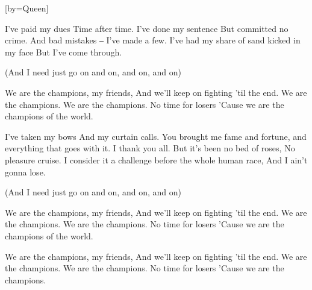  

[by=Queen]



\chordsoff
\beginverse
I've paid my dues
Time after time.
I've done my sentence
But committed no crime.
And bad mistakes ‒
I've made a few.
I've had my share of sand kicked in my face
But I've come through.

(And I need just go on and on, and on, and on)
\endverse

\beginverse
We are the champions, my friends,
And we'll keep on fighting 'til the end.
We are the champions.
We are the champions.
No time for losers
'Cause we are the champions of the world.
\endverse

\beginverse

I've taken my bows
And my curtain calls.
You brought me fame and fortune, and everything that goes with it.
I thank you all.
But it's been no bed of roses,
No pleasure cruise.
I consider it a challenge before the whole human race,
And I ain't gonna lose.

(And I need just go on and on, and on, and on)
\endverse

\beginverse

We are the champions, my friends,
And we'll keep on fighting 'til the end.
We are the champions.
We are the champions.
No time for losers
'Cause we are the champions of the world.
\endverse

\beginverse

We are the champions, my friends,
And we'll keep on fighting 'til the end.
We are the champions.
We are the champions.
No time for losers
'Cause we are the champions. 

\endverse


\endsong
